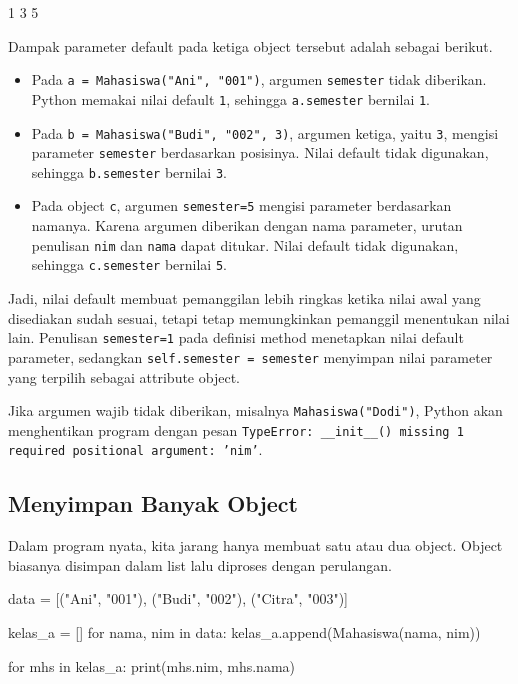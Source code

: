 \begin{keluaran}
1 3 5
\end{keluaran}

Dampak parameter default pada ketiga object tersebut adalah sebagai berikut.

\begin{itemize}
  \item Pada \texttt{a = Mahasiswa("Ani", "001")}, argumen \texttt{semester} tidak diberikan. Python memakai nilai default \texttt{1}, sehingga \texttt{a.semester} bernilai \texttt{1}.
  \item Pada \texttt{b = Mahasiswa("Budi", "002", 3)}, argumen ketiga, yaitu \texttt{3}, mengisi parameter \texttt{semester} berdasarkan posisinya. Nilai default tidak digunakan, sehingga \texttt{b.semester} bernilai \texttt{3}.
  \item Pada object \texttt{c}, argumen \texttt{semester=5} mengisi parameter berdasarkan namanya. Karena argumen diberikan dengan nama parameter, urutan penulisan \texttt{nim} dan \texttt{nama} dapat ditukar. Nilai default tidak digunakan, sehingga \texttt{c.semester} bernilai \texttt{5}.
\end{itemize}

Jadi, nilai default membuat pemanggilan lebih ringkas ketika nilai awal yang disediakan sudah sesuai, tetapi tetap memungkinkan pemanggil menentukan nilai lain. Penulisan \texttt{semester=1} pada definisi method menetapkan nilai default parameter, sedangkan \texttt{self.semester = semester} menyimpan nilai parameter yang terpilih sebagai attribute object.

Jika argumen wajib tidak diberikan, misalnya \texttt{Mahasiswa("Dodi")}, Python akan menghentikan program dengan pesan \texttt{TypeError: \_\_init\_\_() missing 1 required positional argument: 'nim'}.

\subsection{Menyimpan Banyak Object}

Dalam program nyata, kita jarang hanya membuat satu atau dua object. Object biasanya disimpan dalam list lalu diproses dengan perulangan.

\begin{kode}
data = [("Ani", "001"), ("Budi", "002"), ("Citra", "003")]

kelas_a = []
for nama, nim in data:
    kelas_a.append(Mahasiswa(nama, nim))

for mhs in kelas_a:
    print(mhs.nim, mhs.nama)
\end{kode}

